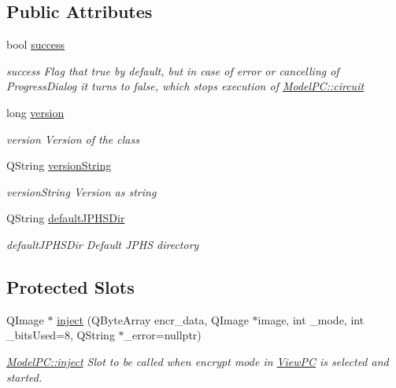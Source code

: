 \subsection*{Public Attributes}
\begin{DoxyCompactItemize}
\item 
bool \hyperlink{class_model_p_c_a945ffbbc44a832b953c191debd448f4c}{success}
\begin{DoxyCompactList}\small\item\em success Flag that true by default, but in case of error or cancelling of Progress\+Dialog it turns to false, which stops execution of \hyperlink{class_model_p_c_a1d0091062a0c836b283ec2f67411623b}{Model\+P\+C\+::circuit} \end{DoxyCompactList}\item 
long \hyperlink{class_model_p_c_a5af48ab89e19be42a94c34ba00249401}{version}
\begin{DoxyCompactList}\small\item\em version Version of the class \end{DoxyCompactList}\item 
Q\+String \hyperlink{class_model_p_c_a5f426725ccf7eefd3c77ea8c720264c9}{version\+String}
\begin{DoxyCompactList}\small\item\em version\+String Version as string \end{DoxyCompactList}\item 
Q\+String \hyperlink{class_model_p_c_abd038306f14f22fb885a1697c96d6335}{default\+J\+P\+H\+S\+Dir}
\begin{DoxyCompactList}\small\item\em default\+J\+P\+H\+S\+Dir Default J\+P\+HS directory \end{DoxyCompactList}\end{DoxyCompactItemize}
\subsection*{Protected Slots}
\begin{DoxyCompactItemize}
\item 
Q\+Image $\ast$ \hyperlink{class_model_p_c_aada6a04d81ada8f2b4ba18108c8d6f10}{inject} (Q\+Byte\+Array encr\+\_\+data, Q\+Image $\ast$image, int \+\_\+mode, int \+\_\+bits\+Used=8, Q\+String $\ast$\+\_\+error=nullptr)
\begin{DoxyCompactList}\small\item\em \hyperlink{class_model_p_c_aada6a04d81ada8f2b4ba18108c8d6f10}{Model\+P\+C\+::inject} Slot to be called when encrypt mode in \hyperlink{class_view_p_c}{View\+PC} is selected and started. \end{DoxyCompactList}\end{DoxyCompactItemize}
